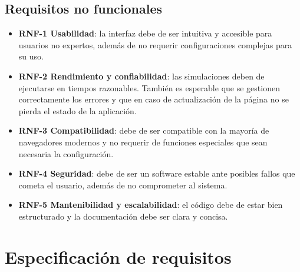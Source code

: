 \subsection{Requisitos no funcionales}
\label{subsec:RequisitosNoFuncionales}
\begin{itemize}
    \item \textbf{RNF-1 Usabilidad}: la interfaz debe de ser intuitiva y accesible para usuarios no expertos, además de no requerir configuraciones complejas para su uso.
    \item \textbf{RNF-2 Rendimiento y confiabilidad}: las simulaciones deben de ejecutarse en tiempos razonables. También es esperable que se gestionen correctamente los errores y que en caso de actualización de la página no se pierda el estado de la aplicación.
    \item \textbf{RNF-3 Compatibilidad}: debe de ser compatible con la mayoría de navegadores modernos y no requerir de funciones especiales que sean necesaria la configuración.
    \item \textbf{RNF-4 Seguridad}: debe de ser un software estable ante posibles fallos que cometa el usuario, además de no comprometer al sistema.
    \item \textbf{RNF-5 Mantenibilidad y escalabilidad}: el código debe de estar bien estructurado y la documentación debe ser clara y concisa.
\end{itemize}

\section{Especificación de requisitos}
\label{sec:EspecificacionRequisitos}


